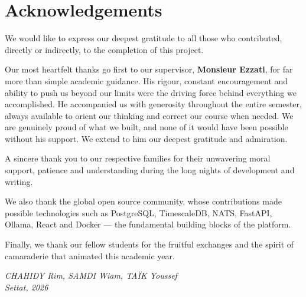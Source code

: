 \chapter*{Acknowledgements}

\vspace{0.5cm}

We would like to express our deepest gratitude to all those who contributed,
directly or indirectly, to the completion of this project.

Our most heartfelt thanks go first to our supervisor, \textbf{Monsieur Ezzati},
for far more than simple academic guidance. His rigour, constant encouragement
and ability to push us beyond our limits were the driving force behind everything
we accomplished. He accompanied us with generosity throughout the entire semester,
always available to orient our thinking and correct our course when needed.
We are genuinely proud of what we built, and none of it would have been possible
without his support. We extend to him our deepest gratitude and admiration.

A sincere thank you to our respective families for their unwavering moral
support, patience and understanding during the long nights of development
and writing.

We also thank the global open source community, whose contributions made
possible technologies such as PostgreSQL, TimescaleDB, NATS, FastAPI, Ollama,
React and Docker — the fundamental building blocks of the \caimp{} platform.

Finally, we thank our fellow students for the fruitful exchanges and the
spirit of camaraderie that animated this academic year.

\bigskip
\begin{flushright}
\textit{CHAHIDY Rim, SAMDI Wiam, TAÏK Youssef}\\
\textit{Settat, 2026}
\end{flushright}
